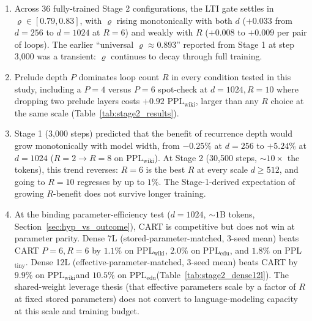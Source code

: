 \documentclass{article}
\newcommand{\cart}{\textsc{CART}}
\newcommand{\pplwiki}{PPL$_\text{wiki}$}
\newcommand{\ppltiny}{PPL$_\text{tiny}$}
\newcommand{\ppledu}{PPL$_\text{edu}$}
\begin{document}
\begin{enumerate}[leftmargin=*, topsep=2pt, itemsep=1pt]
  \item Across 36 fully-trained Stage 2 configurations, the LTI gate settles in $\varrho \in [0.79, 0.83]$, with $\varrho$ rising monotonically with both $d$ ($+0.033$ from $d{=}256$ to $d{=}1024$ at $R{=}6$) and weakly with $R$ ($+0.008$ to $+0.009$ per pair of loops). The earlier ``universal $\varrho \approx 0.893$'' reported from Stage 1 at step 3{,}000 was a transient: $\varrho$ continues to decay through full training.
  \item Prelude depth $P$ dominates loop count $R$ in every condition tested in this study, including a $P{=}4$ versus $P{=}6$ spot-check at $d{=}1024, R{=}10$ where dropping two prelude layers costs $+0.92$ \pplwiki, larger than any $R$ choice at the same scale (Table~\ref{tab:stage2_results}).
  \item Stage 1 (3{,}000 steps) predicted that the benefit of recurrence depth would grow monotonically with model width, from $-0.25\%$ at $d{=}256$ to $+5.24\%$ at $d{=}1024$ ($R{=}2 \to R{=}8$ on \pplwiki). At Stage 2 (30{,}500 steps, $\sim 10\times$ the tokens), this trend reverses: $R{=}6$ is the best $R$ at every scale $d \geq 512$, and going to $R{=}10$ regresses by up to $1\%$. The Stage-1-derived expectation of growing $R$-benefit does not survive longer training.
  \item At the binding parameter-efficiency test ($d{=}1024$, $\sim 1$B tokens, Section~\ref{sec:hyp_vs_outcome}), \cart{} is competitive but does not win at parameter parity. Dense 7L (stored-parameter-matched, 3-seed mean) beats \cart{} $P{=}6, R{=}6$ by $1.1\%$ on \pplwiki, $2.0\%$ on \ppledu, and $1.8\%$ on \ppltiny. Dense 12L (effective-parameter-matched, 3-seed mean) beats \cart{} by $9.9\%$ on \pplwiki and $10.5\%$ on \ppledu (Table~\ref{tab:stage2_dense12l}). The shared-weight leverage thesis (that effective parameters scale by a factor of $R$ at fixed stored parameters) does not convert to language-modeling capacity at this scale and training budget.

\end{enumerate}
\end{document}
